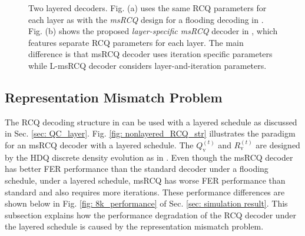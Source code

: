 \documentclass [PhD] {uclathes}
\begin{document}
\begin{figure}[t] 
    \centering
\hfill
  \caption{ Two layered decoders. Fig. (a) uses the same RCQ parameters for each layer as with the  \textit{msRCQ} design for a flooding decoding in \cite{Wang2020-RCQ}. Fig. (b) shows the proposed \textit{layer-specific msRCQ} decoder in \cite{Terrill2021-ec}, which features  separate RCQ parameters for each layer.
  The main difference is that msRCQ decoder uses iteration specific parameters while L-msRCQ decoder considers layer-and-iteration parameters.
  }
  \label{fig: gradient_explosion} 
\end{figure}

\subsection{Representation Mismatch Problem}
The RCQ decoding structure in \cite{Wang2020-RCQ} can be used with a layered schedule as discussed in Sec. \ref{sec: QC_layer}. Fig. \ref{fig: nonlayered_RCQ_str} illustrates the paradigm for an msRCQ decoder with a layered schedule. The $Q_\text{v}^{(t)}$ and $R_\text{v}^{(t)}$ are designed by the HDQ discrete density evolution as in \cite{Wang2020-RCQ}. Even though the msRCQ decoder has better FER performance than the standard \minsum decoder under a flooding schedule\cite{Wang2020-RCQ}, under a layered schedule, msRCQ has worse FER performance than standard \minsum and also requires more iterations.  These performance differences are shown below in Fig.  \ref{fig: 8k_performance} of Sec. \ref{sec: simulation result}. This subsection explains how the performance degradation of the RCQ decoder under the layered schedule is caused by the representation mismatch problem. 
\end{document}
